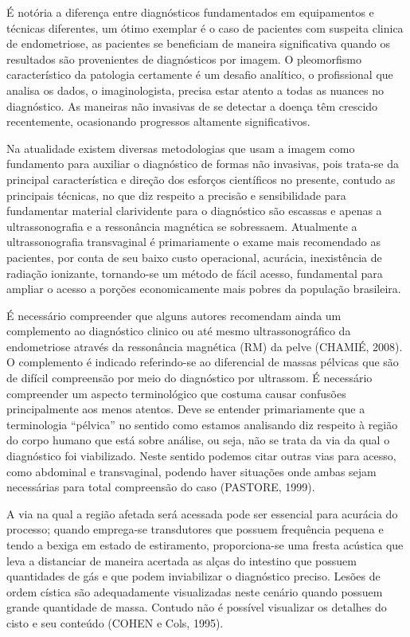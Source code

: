 \documentclass[12pt]{article} %
\begin{document}
É notória a diferença entre diagnósticos fundamentados em equipamentos e técnicas diferentes, um ótimo exemplar é o caso de pacientes com suspeita clinica de endometriose, as pacientes se beneficiam de maneira significativa quando os resultados são provenientes de diagnósticos por imagem. O pleomorfismo característico da patologia certamente é um desafio analítico, o profissional que analisa os dados, o imaginologista, precisa estar atento a todas as nuances no diagnóstico. As maneiras não invasivas de se detectar a doença têm crescido recentemente, ocasionando progressos altamente significativos. 

Na atualidade existem diversas metodologias que usam a imagem como fundamento para auxiliar o diagnóstico de formas não invasivas, pois trata-se da principal característica e direção dos esforços científicos no presente, contudo as principais técnicas, no que diz respeito a precisão e sensibilidade para fundamentar material clarividente para o diagnóstico são escassas e apenas a ultrassonografia e a ressonância magnética se sobressaem. Atualmente a ultrassonografia transvaginal é primariamente o exame mais recomendado as pacientes, por conta de seu baixo custo operacional, acurácia, inexistência de radiação ionizante, tornando-se um método de fácil acesso, fundamental para ampliar o acesso a porções economicamente mais pobres da população brasileira.

É necessário compreender que alguns autores recomendam ainda um complemento ao diagnóstico clinico ou até mesmo ultrassonográfico da endometriose através da ressonância magnética (RM) da pelve (CHAMIÉ, 2008). O complemento é indicado referindo-se ao diferencial de massas pélvicas que são de difícil compreensão por meio do diagnóstico por ultrassom. 
É necessário compreender um aspecto terminológico que costuma causar confusões principalmente aos menos atentos. Deve se entender primariamente que a terminologia “pélvica” no sentido como estamos analisando diz respeito à região do corpo humano que está sobre análise, ou seja, não se trata da via da qual o diagnóstico foi viabilizado. Neste sentido podemos citar outras vias para acesso, como abdominal e transvaginal, podendo haver situações onde ambas sejam necessárias para total compreensão do caso (PASTORE, 1999).

A via na qual a região afetada será acessada pode ser essencial para acurácia do processo; quando emprega-se transdutores que possuem frequência pequena e tendo a bexiga em estado de estiramento, proporciona-se uma fresta acústica que leva a distanciar de maneira acertada as alças do intestino que possuem quantidades de gás e que podem inviabilizar o diagnóstico preciso. Lesões de ordem cística são adequadamente visualizadas neste cenário quando possuem grande quantidade de massa. Contudo não é possível visualizar os detalhes do cisto e seu conteúdo (COHEN e Cols, 1995).
\end{document}
